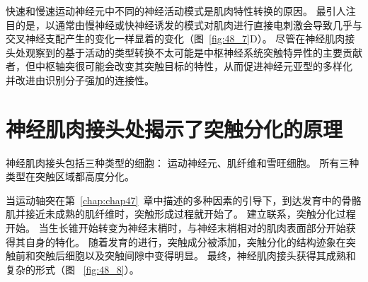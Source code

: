 快速和慢速运动神经元中不同的神经活动模式是肌肉特性转换的原因。
最引人注目的是，以通常由慢神经或快神经诱发的模式对肌肉进行直接电刺激会导致几乎与交叉神经支配产生的变化一样显着的变化（图~\ref{fig:48_7}D）。
尽管在神经肌肉接头处观察到的基于活动的类型转换不太可能是中枢神经系统突触特异性的主要贡献者，但中枢轴突很可能会改变其突触目标的特性，从而促进神经元亚型的多样化 并改进由识别分子强加的连接性。



\section{神经肌肉接头处揭示了突触分化的原理}

神经肌肉接头包括三种类型的细胞：
运动神经元、肌纤维和雪旺细胞。
所有三种类型在突触区域都高度分化。


当运动轴突在第~\ref{chap:chap47}~章中描述的多种因素的引导下，到达发育中的骨骼肌并接近未成熟的肌纤维时，突触形成过程就开始了。
建立联系，突触分化过程开始。
当生长锥开始转变为神经末梢时，与神经末梢相对的肌肉表面部分开始获得其自身的特化。
随着发育的进行，突触成分被添加，突触分化的结构迹象在突触前和突触后细胞以及突触间隙中变得明显。
最终，神经肌肉接头获得其成熟和复杂的形式（图 ~\ref{fig:48_8}）。


